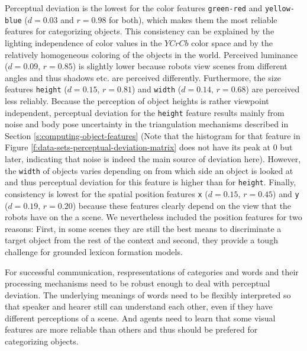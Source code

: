 Perceptual deviation is the lowest for the color features
\texttt{green-red} and \texttt{yellow-blue} ($d=0.03$ and $r=0.98$ for
both), which makes them the most reliable features for categorizing
objects. This consistency can be explained by the lighting
independence of color values in the $YCrCb$ color space and by the
relatively homogeneous coloring of the objects in the world. Perceived
luminance ($d=0.09$, $r=0.85$) is slightly lower because robots view
scenes from different angles and thus shadows etc. are perceived
differently. Furthermore, the size features \texttt{height} ($d=0.15$,
$r=0.81$) and \texttt{width} ($d=0.14$, $r=0.68$) are perceived less
reliably. Because the perception of object heights is rather viewpoint
independent, perceptual deviation for the \texttt{height} feature
results mainly from noise and body pose uncertainty in the
triangulation mechanisms described in Section
\ref{s:computing-object-features} (Note that the histogram for that
feature in Figure \ref{f:data-sets-perceptual-deviation-matrix} does
not have its peak at 0 but later, indicating that noise is indeed the
main source of deviation here). However, the \texttt{width} of objects
varies depending on from which side an object is looked at and thus
perceptual deviation for this feature is higher than for
\texttt{height}. Finally, consistency is lowest for the spatial
position features \texttt{x} ($d=0.15$, $r=0.45$) and \texttt{y}
($d=0.19$, $r=0.20$) because these features clearly depend on the view
that the robots have on the a scene. We nevertheless included the
position features for two reasons: First, in some scenes they are
still the best means to discriminate a target object from the rest of
the context and second, they provide a tough challenge for grounded
lexicon formation models.

For successful communication, respresentations of categories and words
and their processing mechanisms need to be robust enough to deal with
perceptual deviation. The underlying meanings of words need to be
flexibly interpreted so that speaker and hearer still can understand
each other, even if they have different perceptions of a scene. And
agents need to learn that some visual features are more reliable than
others and thus should be prefered for categorizing objects.\\

